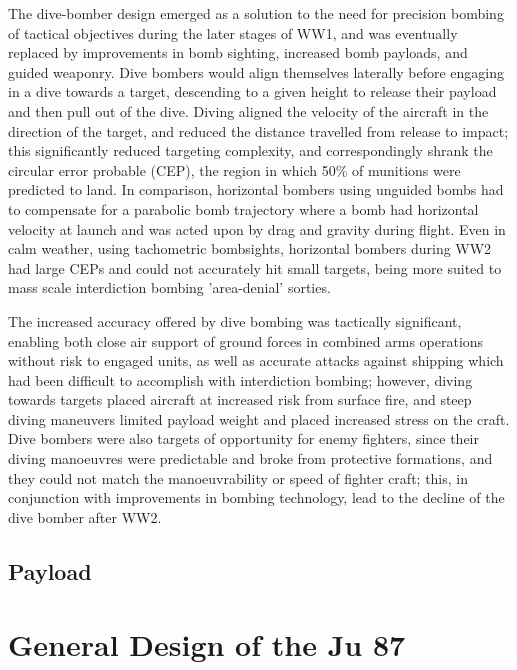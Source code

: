 \documentclass[a4paper, fontsize=11pt]{scrartcl} %
\begin{document}
The dive-bomber design emerged as a solution to the need for precision
bombing of tactical objectives during the later stages of
WW1, and was eventually replaced by improvements in bomb sighting,
increased bomb payloads, and guided weaponry. Dive bombers would align themselves
laterally before engaging in a dive towards a target,
descending to a given height to release their payload and then pull
out of the dive. Diving aligned the velocity of the aircraft in the
direction of the target, and reduced the distance travelled from release
to impact; this significantly reduced targeting complexity, and
correspondingly shrank the circular error probable (CEP), the
region in which 50\% of munitions were predicted to land. In comparison,
horizontal bombers using unguided bombs had to compensate for a parabolic
bomb trajectory where a bomb had horizontal velocity at launch and was
acted upon by drag and gravity during flight. Even in
calm weather, using tachometric bombsights, horizontal bombers during
WW2 had large CEPs and could not accurately hit small targets, being
more suited to mass scale interdiction bombing 'area-denial' sorties.

The increased accuracy offered by dive bombing was tactically
significant, enabling both close air support
of ground forces in combined arms operations without risk to engaged
units, as well as accurate attacks against shipping which had been
difficult to accomplish with interdiction bombing; however, diving
towards targets placed aircraft at increased risk from surface fire, and
steep diving maneuvers limited payload weight and placed increased
stress on the craft. Dive bombers were also targets of opportunity for
enemy fighters, since their diving manoeuvres were predictable and broke from
protective formations, and they could not match the manoeuvrability or
speed of fighter craft; this, in conjunction with improvements in
bombing technology, lead to the decline of the dive bomber after WW2.
\subsection{Payload}
\section{General Design of the Ju 87}
\end{document}
